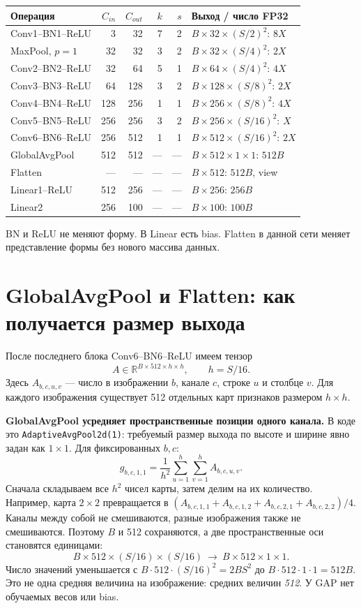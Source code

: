 \documentclass[11pt,a4paper]{article}
\newcommand{\page}[1]{\clearpage\section{#1}}
\begin{document}
\begin{center}\small
\begin{tabular}{lrrrrl}
\toprule
Операция & $C_{in}$ & $C_{out}$ & $k$ & $s$ & Выход / число FP32 \\
\midrule
Conv1--BN1--ReLU & 3 & 32 & 7 & 2 & $B\times32\times(S/2)^2$: $8X$ \\
MaxPool, $p=1$ & 32 & 32 & 3 & 2 & $B\times32\times(S/4)^2$: $2X$ \\
Conv2--BN2--ReLU & 32 & 64 & 5 & 1 & $B\times64\times(S/4)^2$: $4X$ \\
Conv3--BN3--ReLU & 64 & 128 & 3 & 2 & $B\times128\times(S/8)^2$: $2X$ \\
Conv4--BN4--ReLU & 128 & 256 & 1 & 1 & $B\times256\times(S/8)^2$: $4X$ \\
Conv5--BN5--ReLU & 256 & 256 & 3 & 2 & $B\times256\times(S/16)^2$: $X$ \\
Conv6--BN6--ReLU & 256 & 512 & 1 & 1 & $B\times512\times(S/16)^2$: $2X$ \\
GlobalAvgPool & 512 & 512 & --- & --- & $B\times512\times1\times1$: $512B$ \\
Flatten & --- & --- & --- & --- & $B\times512$: $512B$, view \\
Linear1--ReLU & 512 & 256 & --- & --- & $B\times256$: $256B$ \\
Linear2 & 256 & 100 & --- & --- & $B\times100$: $100B$ \\
\bottomrule
\end{tabular}\end{center}
BN и ReLU не меняют форму. В Linear есть bias. Flatten в данной сети меняет
представление формы без нового массива данных.


\page{GlobalAvgPool и Flatten: как получается размер выхода}
После последнего блока Conv6--BN6--ReLU имеем тензор
\[
 A\in\mathbb R^{B\times512\times h\times h},\qquad h=S/16.
\]
Здесь $A_{b,c,u,v}$ --- число в изображении $b$, канале $c$, строке $u$
и столбце $v$. Для каждого изображения существует 512 отдельных карт
признаков размером $h\times h$.

\textbf{GlobalAvgPool усредняет пространственные позиции одного канала.}
В коде это \texttt{AdaptiveAvgPool2d(1)}: требуемый размер выхода по высоте
и ширине явно задан как $1\times1$. Для фиксированных $b,c$:
\[
 g_{b,c,1,1}=\frac{1}{h^2}\sum_{u=1}^{h}\sum_{v=1}^{h}A_{b,c,u,v}.
\]
Сначала складываем все $h^2$ чисел карты, затем делим на их количество.
Например, карта $2\times2$ превращается в
$(A_{b,c,1,1}+A_{b,c,1,2}+A_{b,c,2,1}+A_{b,c,2,2})/4$.
Каналы между собой не смешиваются, разные изображения также не смешиваются.
Поэтому $B$ и 512 сохраняются, а две пространственные оси становятся единицами:
\[
 B\times512\times(S/16)\times(S/16)
 \ \longrightarrow\ B\times512\times1\times1.
\]
Число значений уменьшается с $B\cdot512\cdot(S/16)^2=2BS^2$
до $B\cdot512\cdot1\cdot1=512B$.
Это не одна средняя величина на изображение: средних величин \emph{512}.
У GAP нет обучаемых весов или bias.
\end{document}
